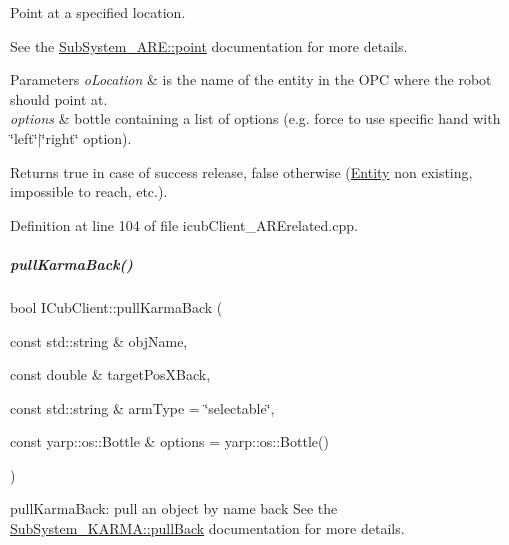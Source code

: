 Point at a specified location. 

See the \hyperlink{group__icubclient__subsystems_a92fbb5f6c28b6bf9c7dec4ef3737b7c6}{Sub\+System\+\_\+\+A\+R\+E\+::point} documentation for more details. 
\begin{DoxyParams}{Parameters}
{\em o\+Location} & is the name of the entity in the O\+PC where the robot should point at. \\
\hline
{\em options} & bottle containing a list of options (e.\+g. force to use specific hand with \char`\"{}left\char`\"{}$\vert$\char`\"{}right\char`\"{} option). \\
\hline
\end{DoxyParams}
\begin{DoxyReturn}{Returns}
true in case of success release, false otherwise (\hyperlink{group__icubclient__representations_classicubclient_1_1Entity}{Entity} non existing, impossible to reach, etc.). 
\end{DoxyReturn}


Definition at line 104 of file icub\+Client\+\_\+\+A\+R\+Erelated.\+cpp.

\mbox{\label{group__icubclient__clients_a5deec64a5964aacb94268867e804ae1e}} 
\subparagraph{\texorpdfstring{pull\+Karma\+Back()}{pullKarmaBack()}}
{\footnotesize\ttfamily bool I\+Cub\+Client\+::pull\+Karma\+Back (\begin{DoxyParamCaption}\item[{const std\+::string \&}]{obj\+Name,  }\item[{const double \&}]{target\+Pos\+X\+Back,  }\item[{const std\+::string \&}]{arm\+Type = {\ttfamily \char`\"{}selectable\char`\"{}},  }\item[{const yarp\+::os\+::\+Bottle \&}]{options = {\ttfamily yarp\+:\+:os\+:\+:Bottle()} }\end{DoxyParamCaption})}



pull\+Karma\+Back\+: pull an object by name back See the \hyperlink{group__icubclient__subsystems_a956b5bad90e96ca0c2c8f33f306256ac}{Sub\+System\+\_\+\+K\+A\+R\+M\+A\+::pull\+Back} documentation for more details. 


